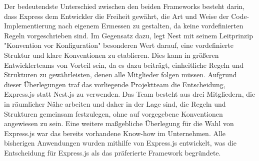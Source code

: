 Der bedeutendste Unterschied zwischen den beiden Frameworks besteht darin, dass Express dem Entwickler die Freiheit gewährt, die Art und Weise der Code-Implementierung nach eigenem Ermessen zu gestalten, da keine vordefinierten Regeln vorgeschrieben sind. Im Gegensatz dazu, legt Nest mit seinem Leitprinzip "Konvention vor Konfiguration" besonderen Wert darauf, eine vordefinierte Struktur und klare Konventionen zu etablieren. Dies kann in größeren Entwicklerteams von Vorteil sein, da es dazu beiträgt, einheitliche Regeln und Strukturen zu gewährleisten, denen alle Mitglieder folgen müssen.
\newline
Aufgrund dieser Überlegungen traf das vorliegende Projektteam die Entscheidung, Express.js statt Nest.js zu verwenden. Das Team besteht aus drei Mitgliedern, die in räumlicher Nähe arbeiten und daher in der Lage sind, die Regeln und Strukturen gemeinsam festzulegen, ohne auf vorgegebene Konventionen angewiesen zu sein. Eine weitere maßgebliche Überlegung für die Wahl von Express.js war das bereits vorhandene Know-how im Unternehmen. Alle bisherigen Anwendungen wurden mithilfe von Express.js entwickelt, was die Entscheidung für Express.js als das präferierte Framework begründete.
\cite{express_js_vs_nest_js}